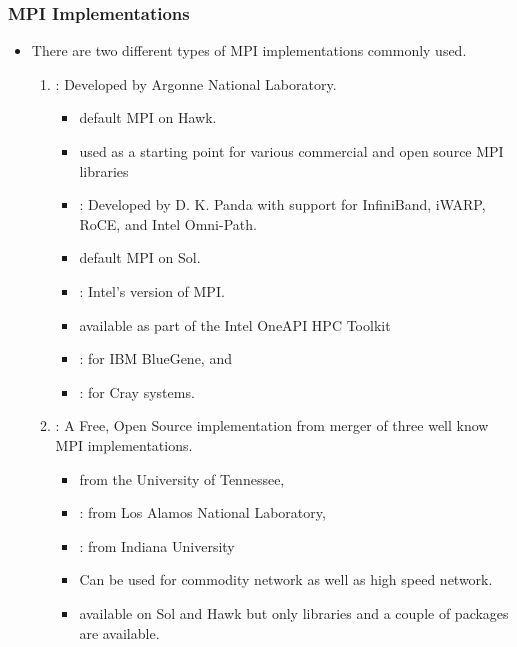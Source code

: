 \documentclass[9pt,c]{beamer}
\begin{document}
\begin{frame}
  \frametitle{MPI Implementations}
  \begin{itemize}
    \item There are two different types of MPI implementations commonly used. 
    \begin{enumerate}
       \item {}: Developed by Argonne National Laboratory. 
       \begin{itemize}
           \item default MPI on Hawk.
           \item used as a starting point for various commercial and open source MPI libraries
           \item {}: Developed by D. K. Panda with support for  InfiniBand, iWARP, RoCE, and Intel Omni-Path. 
           \item[] default MPI on Sol.
           \item {}: Intel's version of MPI. 
           \item[] available as part of the Intel OneAPI HPC Toolkit
           \item {}:  for IBM BlueGene, and 
           \item {}: for Cray systems.
       \end{itemize}
       \item {}: A Free, Open Source implementation from merger of three well know MPI implementations. 
       \begin{itemize}
           \item {} from the University of Tennessee,
           \item {}: from Los Alamos National Laboratory,
           \item {}: from Indiana University
           \item Can be used for commodity network as well as high speed network.
           \item available on Sol and Hawk but only libraries and a couple of packages are available.
       \end{itemize}
    \end{enumerate}
  \end{itemize}
\end{frame}
\end{document}
